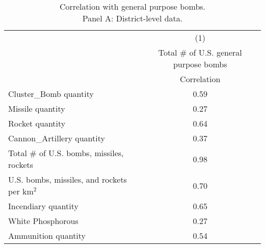 \begin{table}[htbp]\centering
\def\sym#1{\ifmmode^{#1}\else\(^{#1}\)\fi}
\caption{Correlation with general purpose bombs. \\ Panel A: District-level data.}
\begin{tabular}{l*{1}{c}}
\toprule
                &\multicolumn{1}{c}{(1)}\\
                &\multicolumn{1}{c}{Total # of U.S. general purpose bombs}\\
                &Correlation\\
\midrule
Cluster\_Bomb quantity&     0.59\\
Missile quantity&     0.27\\
Rocket quantity &     0.64\\
Cannon\_Artillery quantity&     0.37\\
Total # of U.S. bombs, missiles, rockets&     0.98\\
U.S. bombs, missiles, and rockets per km$^2$&     0.70\\
Incendiary quantity&     0.65\\
White Phosphorous&     0.27\\
Ammunition quantity&     0.54\\
\bottomrule
\end{tabular}
\end{table}
